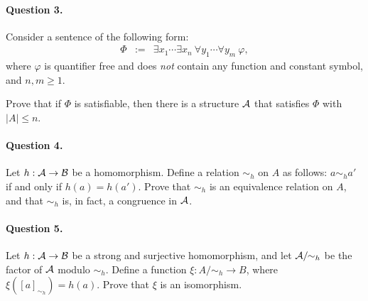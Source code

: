 \documentclass[11pt, a4paper]{article}
\begin{document}

\paragraph*{Question 3.}
Consider a sentence of the following form:
\begin{eqnarray*}
\Phi & := & \exists x_1 \cdots \exists x_n \ \forall y_1 \cdots \forall y_m \ \varphi,
\end{eqnarray*}
where $\varphi$ is quantifier free and does {\em not} contain any function and constant symbol, and $n,m $.

Prove that if $\Phi$ is satisfiable, then there is a structure $\mathcal{A}$ that satisfies $\Phi$ with $|A|\leq n$. 


\paragraph*{Question 4.}
Let $h:\mathcal{A} \to \mathcal{B}$ be a homomorphism.
Define a relation $\sim_h$ on $A$ as follows:
$a \sim_h a'$ if and only if $h(a)=h(a')$.
Prove that $\sim_h$ is an equivalence relation on $A$,
and that $\sim_h$ is, in fact, a congruence in $\mathcal{A}$.

\paragraph*{Question 5.}
Let $h:\mathcal{A}\to\mathcal{B}$ be a strong and surjective homomorphism,
and let $\mathcal{A}/\!\!\sim_h$ be the factor of $\mathcal{A}$ modulo $\sim_h$.
Define a function $\xi:A/\!\!\sim_h \to B$,
where $\xi([a]_{\sim_h}) = h(a)$.
Prove that $\xi$ is an isomorphism.
\end{document}
